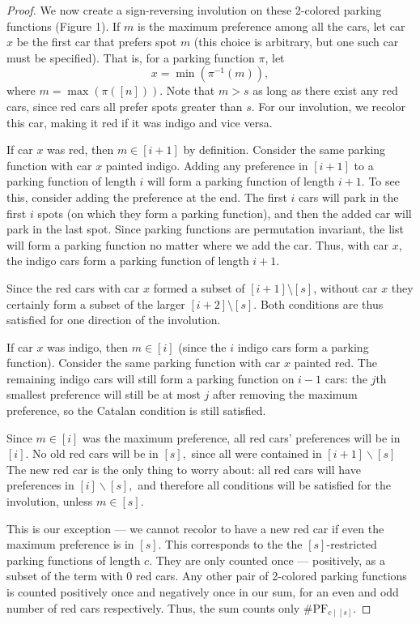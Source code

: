 \documentclass[12 pt]{amsart}
\theoremstyle{definition} %
\theoremstyle{remark} %
\begin{document}
\begin{proof}
	We now create a sign-reversing involution on these 2-colored parking functions (Figure 1). If $m$ is the maximum preference among all the cars, let car $x$ be the first car that prefers spot $m$ (this choice is arbitrary, but one such car must be specified). That is, for a parking function $\pi$, let \[x = \min(\pi^{-1}(m)),\] where $m=\max(\pi([n]))$. Note that $m > s$ as long as there exist any red cars, since red cars all prefer spots greater than $s$. For our involution, we recolor this car, making it red if it was indigo and vice versa. 

	If car $x$ was red, then  $m\in [i + 1]$ by definition. Consider the same parking function with car $x$ painted indigo. Adding any preference in $[i + 1]$ to a parking function of length $i$ will form a parking function of length $i + 1$. To see this, consider adding the preference at the end. The first $i$ cars will park in the first $i$ spots (on which they form a parking function), and then the added car will park in the last spot. Since parking functions are permutation invariant, the list will form a parking function no matter where we add the car. Thus, with car $x$, the indigo cars form a parking function of length $i + 1$.
    
    Since the red cars with car $x$ formed a subset of $[i + 1] \setminus [s]$, without car $x$ they certainly form a subset of the larger $[i + 2] \setminus [s]$. Both conditions are thus satisfied for one direction of the involution.

	If car $x$ was indigo, then $m \in [i]$ (since the $i$ indigo cars form a parking function). Consider the same parking function with car $x$ painted red. The remaining indigo cars will still form a parking function on $i - 1$ cars: the $j$th smallest preference will still be at most $j$ after removing the maximum preference, so the Catalan condition is still satisfied.
    
    Since $m \in [i]$ was the maximum preference, all red cars' preferences will be in $[i].$ No old red cars will be in $[s],$ since all were contained in $[i+1]\backslash [s]$ The new red car is the only thing to worry about: all red cars will have preferences in $[i]\backslash [s],$ and therefore all conditions will be satisfied for the involution, unless $m\in [s].$

	This is our exception --- we cannot recolor to have a new red car if even the maximum preference is in $[s]$. This corresponds to the the $[s]$-restricted parking functions of length $c$. They are only counted once --- positively, as a subset of the term with 0 red cars. Any other pair of 2-colored parking functions is counted positively once and negatively once in our sum, for an even and odd number of red cars respectively. Thus, the sum counts only $\#\mathrm{PF}_{c \mid [s]}$.
\end{proof}
\end{document}
